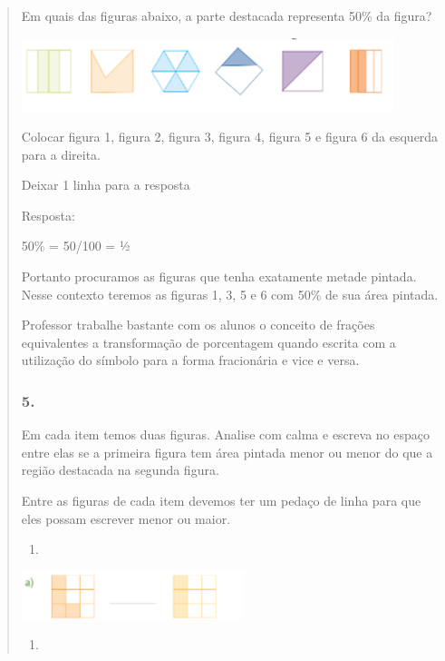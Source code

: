\begin{enumerate}
\begin{escolha}
\begin{enumerate}
\begin{itemize}
\begin{itemize}
\begin{escolha}
\begin{quote}
\begin{escolha}
{Em quais das figuras abaixo, a parte destacada representa 50\% da
figura?

\includegraphics[width=4.27537in,height=0.84174in]{media/image107.png}

Colocar figura 1, figura 2, figura 3, figura 4, figura 5 e figura 6 da
esquerda para a direita.

Deixar 1 linha para a resposta

Resposta:

50\% = 50/100 = ½

Portanto procuramos as figuras que tenha exatamente metade pintada.
Nesse contexto teremos as figuras 1, 3, 5 e 6 com 50\% de sua área
pintada.

Professor trabalhe bastante com os alunos o conceito de frações
equivalentes a transformação de porcentagem quando escrita com a
utilização do símbolo para a forma fracionária e vice e versa.

\subsubsection{5. }\label{section-108}

Em cada item temos duas figuras. Analise com calma e escreva no espaço
entre elas se a primeira figura tem área pintada menor ou menor do que a
região destacada na segunda figura.

Entre as figuras de cada item devemos ter um pedaço de linha para que
eles possam escrever menor ou maior.

\begin{enumerate}
\def\labelenumi{\alph{enumi})}
\item
\end{enumerate}

\includegraphics[width=2.55022in,height=0.55005in]{media/image108.png}

\begin{enumerate}
\def\labelenumi{\alph{enumi})}
\item
\end{enumerate}

}
\end{escolha}
\end{quote}
\end{escolha}
\end{itemize}
\end{itemize}
\end{enumerate}
\end{escolha}
\end{enumerate}
